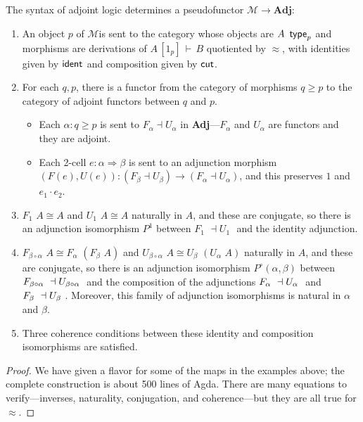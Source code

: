 \documentclass{drl-common/llncs}
\newcommand{\M}{\ensuremath{\mathcal{M}}}
\newcommand{\la}{\ensuremath{\dashv}}
\newcommand{\tc}[2]{\ensuremath{#1 \Rightarrow #2}}
\newcommand{\Adj}{\textbf{Adj}}
\newcommand\compo[2]{\ensuremath{#1 \circ #2}}
\newcommand\compv[2]{\ensuremath{#1 \cdot #2}}
\renewcommand\wftp[2]{\ensuremath{#1 \,\,\, \dsd{type}_{#2}}}
\newcommand\F[2]{\ensuremath{F_{#1} \,\, #2}}
\newcommand\U[2]{\ensuremath{U_{#1} \,\, #2}}
\newcommand\seq[3]{\ensuremath{#1 \, [ #2 ] \, \vdash \, #3}}
\newcommand\ident[1]{\ensuremath{\dsd{ident}_{#1}}}
\newcommand\cutsym{\ensuremath{\dsd{cut}}}
\newcommand\ap[2]{\ensuremath{#1 \approx #2}}
\newcommand\iso{\cong}
\begin{document}
\begin{theorem} \label{thm:syntacticpseudofunctor}
The syntax of adjoint logic determines a pseudofunctor $\M \to \Adj$:
\begin{enumerate}
\item An object $p$ of \M is sent to the category whose objects are
  \wftp{A}{p} and morphisms are derivations of
  \seq{A}{1_p}{B} quotiented by $\ap{}{}$, with identities given by
  \ident{} and composition given by \cutsym.

\item For each $q,p$, there is a functor from the category of morphisms
  $q \ge p$ to the category of adjoint functors between $q$ and $p$.
  \begin{itemize}
  \item 
  Each $\alpha : q \ge p$ is sent to $F_\alpha \la U_\alpha$ in
  \Adj---$F_\alpha$ and $U_\alpha$ are functors and they are adjoint.

  \item Each 2-cell $e : \tc{\alpha}{\beta}$ is sent to an adjunction
    morphism $(F(e),U(e)) : (F_\beta \la U_\beta) \to (F_\alpha \la
    U_\alpha)$, and this preserves $1$ and $\compv{e_1}{e_2}$.
  \end{itemize}

\item $\F 1 A \iso A$ and $\U 1 A \iso A$ naturally in $A$, and these
  are conjugate, so there is an adjunction isomorphism $P^1$ between $\F 1 {}
  \la \U 1 {}$ and the identity adjunction.

\item $\F {\compo{\beta}{\alpha}} A \iso \F \alpha {(\F \beta A)}$ and
  $\U {\compo{\beta}{\alpha}} A \iso \U \beta {(\U \alpha A)}$ naturally
  in $A$, and these are conjugate, so there is an adjunction isomorphism
  $P^{\circ}(\alpha,\beta)$ between $\F {\compo{\beta}{\alpha}} \la \U
  {\compo{\beta}{\alpha}}$ and the composition of the adjunctions $\F
  {\alpha} \la \U {\alpha}$ and $\F {\beta} \la \U {\beta}$.  Moreover,
  this family of adjunction isomorphisms is natural in $\alpha$ and
  $\beta$.

\item Three coherence conditions between these identity and composition
  isomorphisms are satisfied.
\end{enumerate}
\end{theorem}

\begin{proof}
We have given a flavor for some of the maps in the examples above; the
complete construction is about 500 lines of Agda.  There are many
equations to verify---inverses, naturality, conjugation, and
coherence---but they are all true for \ap{}{}.
\end{proof}
\end{document}
